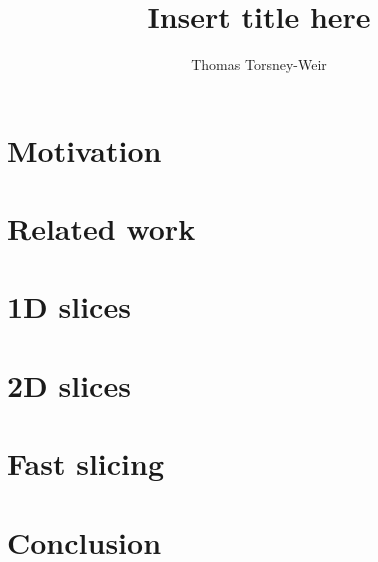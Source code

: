 \documentclass[a4paper,12pt]{memoir}
\title{Insert title here}
\author{Thomas Torsney-Weir}
\date{}
\begin{document}
\DoubleSpacing

\maketitle

\listoffixmes

\tableofcontents

\chapter{Motivation}


\chapter{Related work}


\chapter{1D slices}


\chapter{2D slices}


\chapter{Fast slicing}


\chapter{Conclusion}



\end{document}
